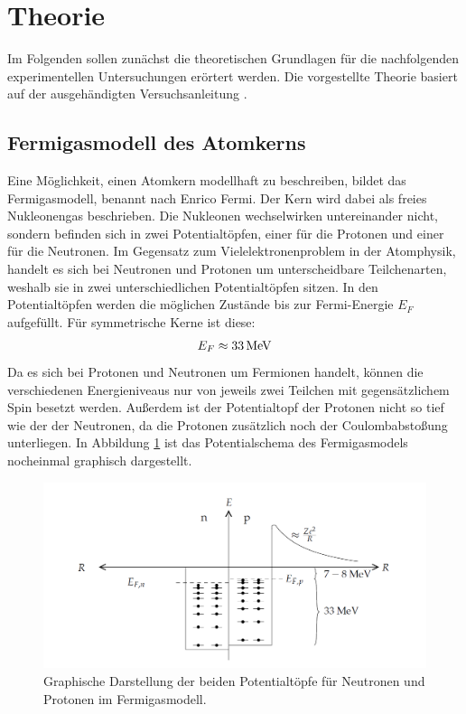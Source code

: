 \section{Theorie}
	
Im Folgenden sollen zunächst die theoretischen Grundlagen für die nachfolgenden experimentellen Untersuchungen erörtert werden.
Die vorgestellte Theorie basiert auf der ausgehändigten Versuchsanleitung \cite{wwu}.

\subsection{Fermigasmodell des Atomkerns}
Eine Möglichkeit, einen Atomkern modellhaft zu beschreiben, bildet das Fermigasmodell, benannt nach Enrico Fermi. Der Kern wird dabei als freies Nukleonengas beschrieben. Die Nukleonen wechselwirken untereinander nicht, sondern befinden sich in zwei Potentialtöpfen, einer für die Protonen und einer für die Neutronen. Im Gegensatz zum Vielelektronenproblem in der Atomphysik, handelt es sich bei Neutronen und Protonen um unterscheidbare Teilchenarten, weshalb sie in zwei unterschiedlichen Potentialtöpfen sitzen. In den Potentialtöpfen werden die möglichen Zustände bis zur Fermi-Energie $E_F$ aufgefüllt. Für symmetrische Kerne ist diese:
\begin{align*}
E_F\approx 33\,\textnormal{MeV}
\end{align*}
\noindent Da es sich bei Protonen und Neutronen um Fermionen handelt, können die verschiedenen Energieniveaus nur von jeweils zwei Teilchen mit gegensätzlichem Spin besetzt werden. Außerdem ist der Potentialtopf der Protonen nicht so tief wie der der Neutronen, da die Protonen zusätzlich noch der Coulombabstoßung unterliegen. In Abbildung \ref{fermigas} ist das Potentialschema des Fermigasmodels nocheinmal graphisch dargestellt.

\begin{figure}[h]
	\centering
	\includegraphics[width=1.0\textwidth]{img/fermigas}
	\caption{Graphische Darstellung der beiden Potentialtöpfe für Neutronen und Protonen im Fermigasmodell. \cite{fermi}}
	\label{fermigas}
\end{figure}

